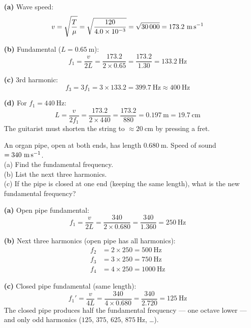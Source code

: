 \begin{solutionbox}
\textbf{(a)} Wave speed:
\[
  v = \sqrt{\frac{T}{\mu}}
  = \sqrt{\frac{120}{4.0\times10^{-3}}}
  = \sqrt{30\,000}
  = 173.2\ \text{m\,s}^{-1}
\]

\textbf{(b)} Fundamental ($L = 0.65\ \text{m}$):
\[
  f_1 = \frac{v}{2L}
  = \frac{173.2}{2 \times 0.65}
  = \frac{173.2}{1.30}
  = 133.2\ \text{Hz}
\]

\textbf{(c)} 3rd harmonic:
\[
  f_3 = 3f_1 = 3 \times 133.2 = 399.7\ \text{Hz}
  \approx 400\ \text{Hz}
\]

\textbf{(d)} For $f_1 = 440\ \text{Hz}$:
\[
  L = \frac{v}{2f_1}
  = \frac{173.2}{2 \times 440}
  = \frac{173.2}{880}
  = 0.197\ \text{m} = 19.7\ \text{cm}
\]
The guitarist must shorten the string to $\approx 20\ \text{cm}$
by pressing a fret.
\end{solutionbox}

\begin{examplebox}[17.3]
An organ pipe, open at both ends, has length
$0.680\ \text{m}$. Speed of sound $= 340\ \text{m\,s}^{-1}$.\\
(a) Find the fundamental frequency.\\
(b) List the next three harmonics.\\
(c) If the pipe is closed at one end (keeping
the same length), what is the new fundamental
frequency?
\end{examplebox}

\begin{solutionbox}
\textbf{(a)} Open pipe fundamental:
\[
  f_1 = \frac{v}{2L}
  = \frac{340}{2 \times 0.680}
  = \frac{340}{1.360}
  = 250\ \text{Hz}
\]

\textbf{(b)} Next three harmonics (open pipe has
all harmonics):
\begin{align*}
  f_2 &= 2 \times 250 = 500\ \text{Hz}\\
  f_3 &= 3 \times 250 = 750\ \text{Hz}\\
  f_4 &= 4 \times 250 = 1000\ \text{Hz}
\end{align*}

\textbf{(c)} Closed pipe fundamental (same length):
\[
  f_1' = \frac{v}{4L}
  = \frac{340}{4 \times 0.680}
  = \frac{340}{2.720}
  = 125\ \text{Hz}
\]
The closed pipe produces half the fundamental
frequency --- one octave lower --- and only odd
harmonics ($125$, $375$, $625$, $875\ \text{Hz}$, \ldots).
\end{solutionbox}

